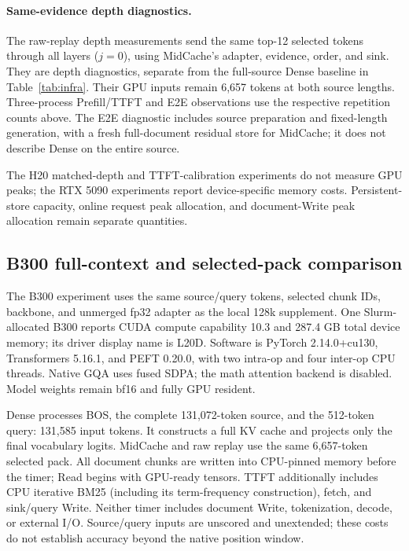 \paragraph{Same-evidence depth diagnostics.}


The raw-replay depth measurements send the same top-12 selected tokens through all layers ($j=0$), using MidCache's adapter, evidence, order, and sink. They are depth diagnostics, separate from the full-source Dense baseline in Table~\ref{tab:infra}. Their GPU inputs remain 6,657 tokens at both source lengths. Three-process Prefill/TTFT and E2E observations use the respective repetition counts above. The E2E diagnostic includes source preparation and fixed-length generation, with a fresh full-document residual store for MidCache; it does not describe Dense on the entire source.

The H20 matched-depth and TTFT-calibration experiments do not measure GPU peaks; the RTX 5090 experiments report device-specific memory costs. Persistent-store capacity, online request peak allocation, and document-Write peak allocation remain separate quantities.

\subsection{B300 full-context and selected-pack comparison}
\label{app:b300-recheck}

The B300 experiment uses the same source/query tokens, selected chunk IDs, backbone, and unmerged fp32 adapter as the local 128k supplement. One Slurm-allocated B300 reports CUDA compute capability 10.3 and 287.4 GB total device memory; its driver display name is L20D. Software is PyTorch 2.14.0+cu130, Transformers 5.16.1, and PEFT 0.20.0, with two intra-op and four inter-op CPU threads. Native GQA uses fused SDPA; the math attention backend is disabled. Model weights remain bf16 and fully GPU resident.

Dense processes BOS, the complete 131,072-token source, and the 512-token query: 131,585 input tokens. It constructs a full KV cache and projects only the final vocabulary logits. MidCache and raw replay use the same 6,657-token selected pack. All document chunks are written into CPU-pinned memory before the timer; Read begins with GPU-ready tensors. TTFT additionally includes CPU iterative BM25 (including its term-frequency construction), fetch, and sink/query Write. Neither timer includes document Write, tokenization, decode, or external I/O. Source/query inputs are unscored and unextended; these costs do not establish accuracy beyond the native position window.

